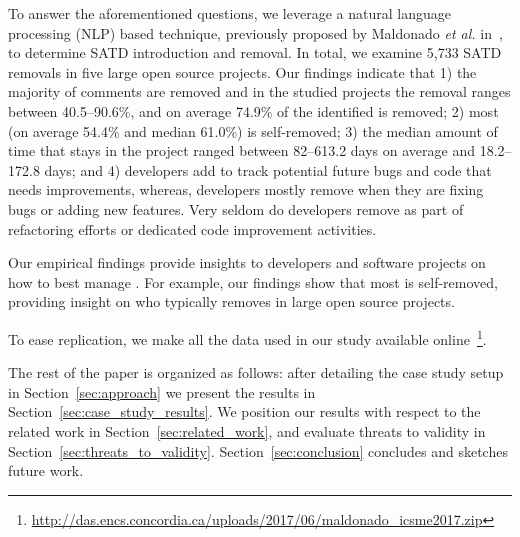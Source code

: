 To answer the aforementioned questions, we leverage a natural language processing (NLP) based technique, previously proposed by Maldonado \emph{et al.} in~\cite{Maldonado2015TSE}, to determine SATD introduction and removal. In total, we examine 5,733 SATD removals in five large open source projects. Our findings indicate that 1) the majority of \SATD comments are removed and in the studied projects the removal ranges between 40.5--90.6\%, and on average 74.9\% of the identified \SATD is removed; 2) most \SATD (on average 54.4\% and median 61.0\%) is self-removed; 3) the median amount of time that \SATD stays in the project ranged between 82--613.2 days on average and 18.2--172.8 days; and 4) developers add \SATD to track potential future bugs and code that needs improvements, whereas, developers mostly remove \SATD when they are fixing bugs or adding new features. Very seldom do developers remove \SATD as part of refactoring efforts or dedicated code improvement activities.

Our empirical findings provide insights to developers and software projects on how to best manage \SATD. For example, our findings show that most \SATD is self-removed, providing insight on who typically removes \SATD in large open source projects.

To ease replication, we make all the data used in our study available online~\footnote{\url{http://das.encs.concordia.ca/uploads/2017/06/maldonado_icsme2017.zip}}.

The rest of the paper is organized as follows: after detailing the case study setup in Section~\ref{sec:approach} we present the results in Section~\ref{sec:case_study_results}. We position our results with respect to the related work in Section~\ref{sec:related_work}, and evaluate threats to validity in Section~\ref{sec:threats_to_validity}.  Section~\ref{sec:conclusion} concludes and sketches future work.





